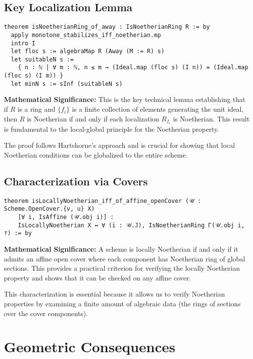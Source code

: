 \documentclass{article}
\theoremstyle{definition}
\begin{document}
\subsection{Key Localization Lemma}

\begin{lstlisting}
theorem isNoetherianRing_of_away : IsNoetherianRing R := by
  apply monotone_stabilizes_iff_noetherian.mp
  intro I
  let floc s := algebraMap R (Away (M := R) s)
  let suitableN s :=
    { n : ℕ | ∀ m : ℕ, n ≤ m → (Ideal.map (floc s) (I n)) = (Ideal.map (floc s) (I m)) }
  let minN s := sInf (suitableN s)
\end{lstlisting}

\textbf{Mathematical Significance:} This is the key technical lemma establishing that if $R$ is a ring and $\{f_i\}$ is a finite collection of elements generating the unit ideal, then $R$ is Noetherian if and only if each localization $R_{f_i}$ is Noetherian. This result is fundamental to the local-global principle for the Noetherian property.

The proof follows Hartshorne's approach and is crucial for showing that local Noetherian conditions can be globalized to the entire scheme.

\subsection{Characterization via Covers}

\begin{lstlisting}
theorem isLocallyNoetherian_iff_of_affine_openCover (𝒰 : Scheme.OpenCover.{v, u} X)
    [∀ i, IsAffine (𝒰.obj i)] :
    IsLocallyNoetherian X ↔ ∀ (i : 𝒰.J), IsNoetherianRing Γ(𝒰.obj i, ⊤) := by
\end{lstlisting}

\textbf{Mathematical Significance:} A scheme is locally Noetherian if and only if it admits an affine open cover where each component has Noetherian ring of global sections. This provides a practical criterion for verifying the locally Noetherian property and shows that it can be checked on any affine cover.

This characterization is essential because it allows us to verify Noetherian properties by examining a finite amount of algebraic data (the rings of sections over the cover components).

\section{Geometric Consequences}
\end{document}
